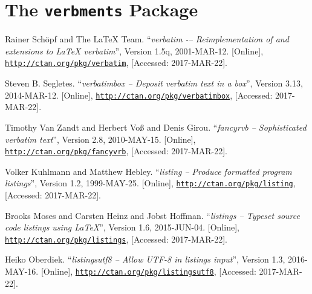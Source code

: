 \documentclass[article,a4paper,oneside,10pt]{memoir}
\newcommand\code[1]{\texttt{#1}}
\begin{document}
\chapter{The \code{verbments}        Package \cite{verbments}}
\label{chap:minted}


\vfill
\begin{thebibliography}{1}

        Rainer Sch\"opf and The \LaTeX{} Team.
        ``\emph{verbatim -– Reimplementation of and extensions to \LaTeX{} verbatim}'',
        Version 1.5q,
        2001-MAR-12.
        [Online],
        \href{http://ctan.org/pkg/verbatim}{\nolinkurl{http://ctan.org/pkg/verbatim}},
        [Accessed: 2017-MAR-22].

        Steven B. Segletes.
        ``\emph{verbatimbox – Deposit verbatim text in a box}'',
        Version 3.13,
        2014-MAR-12.
        [Online],
        \href{http://ctan.org/pkg/verbatimbox}{\nolinkurl{http://ctan.org/pkg/verbatimbox}},
        [Accessed: 2017-MAR-22].

        Timothy Van Zandt and Herbert Vo\ss{} and Denis Girou.
        ``\emph{fancyrvb -- Sophisticated verbatim text}'',
        Version 2.8,
        2010-MAY-15.
        [Online],
        \href{http://ctan.org/pkg/fancyvrb}{\nolinkurl{http://ctan.org/pkg/fancyvrb}},
        [Accessed: 2017-MAR-22].

        Volker Kuhlmann and Matthew Hebley.
        ``\emph{listing -- Produce formatted program listings}'',
        Version 1.2,
        1999-MAY-25.
        [Online],
        \href{http://ctan.org/pkg/listing}{\nolinkurl{http://ctan.org/pkg/listing}},
        [Accessed: 2017-MAR-22].

        Brooks Moses and Carsten Heinz and Jobst Hoffman.
        ``\emph{listings -- Typeset source code listings using \LaTeX}'',
        Version 1.6,
        2015-JUN-04.
        [Online],
        \href{http://ctan.org/pkg/listings}{\nolinkurl{http://ctan.org/pkg/listings}},
        [Accessed: 2017-MAR-22].

        Heiko Oberdiek.
        ``\emph{listingsutf8 -- Allow UTF-8 in listings input}'',
        Version 1.3,
        2016-MAY-16.
        [Online],
        \href{http://ctan.org/pkg/listingsutf8}{\nolinkurl{http://ctan.org/pkg/listingsutf8}},
        [Accessed: 2017-MAR-22].


\end{thebibliography}
\end{document}

